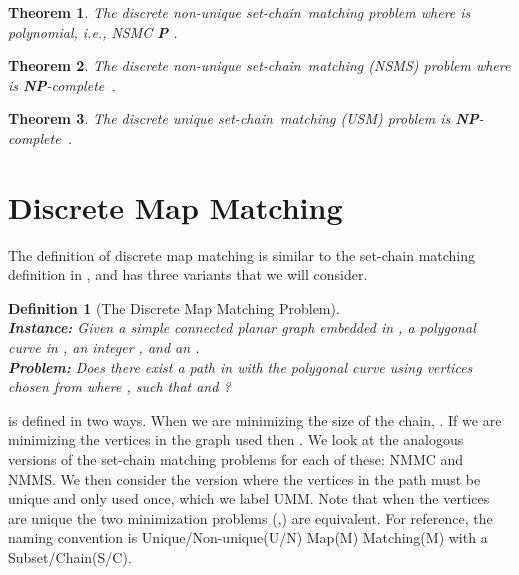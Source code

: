 \documentclass{article}[11pt]
\newcommand{\npc}{\textbf{NP}-complete}
\newcommand{\scm}{set-chain}
\newtheorem{definition}{Definition}
\newtheorem{theorem}{Theorem}
\begin{document}
\begin{theorem} \label{thm:nsmck}
    The discrete non-unique \scm\ matching problem where  is polynomial, i.e., NSMC  \textbf{P} \cite{Wylie:2014:TCS}.
\end{theorem}

\begin{theorem} \label{thm:nsmsk}
    The discrete non-unique \scm\ matching (NSMS) problem where  is \npc\ \cite{Wylie:2014:TCS}.
\end{theorem}

\begin{theorem} \label{thm:usmck}
    The discrete unique \scm\ matching (USM) problem is \npc\ \cite{Wylie:2014:TCS}.
\end{theorem}




\section{Discrete Map Matching} \label{sec:dismmatch}


The definition of discrete map matching is similar to the set-chain matching definition 
in \cite{Wylie:2014:TCS}, and has three variants that we will consider.  


\begin{definition}[The Discrete Map Matching Problem]\hfill \\
    \noindent
    {\bf Instance:}
    Given a simple connected planar graph  embedded in , 
    a polygonal curve  in  , an integer ,  
    and an . \\
    \noindent
    {\bf Problem:}
    Does there exist a path  in  with the polygonal curve using
    vertices chosen from  where , 
    such that  and ?
\end{definition}

 is defined in two ways.  When we are minimizing the size of the chain, .
If we are minimizing the vertices in the graph used then .   
We look at the analogous
versions of the set-chain matching problems for each of these: NMMC and NMMS.
We then consider the version where the vertices in the path must be unique and only
used once, which we label UMM.  
Note that when the vertices are unique the two minimization problems (,)
are equivalent.
For reference, the naming convention is Unique/Non-unique(U/N) 
Map(M) Matching(M) with a  Subset/Chain(S/C).  
\end{document}

